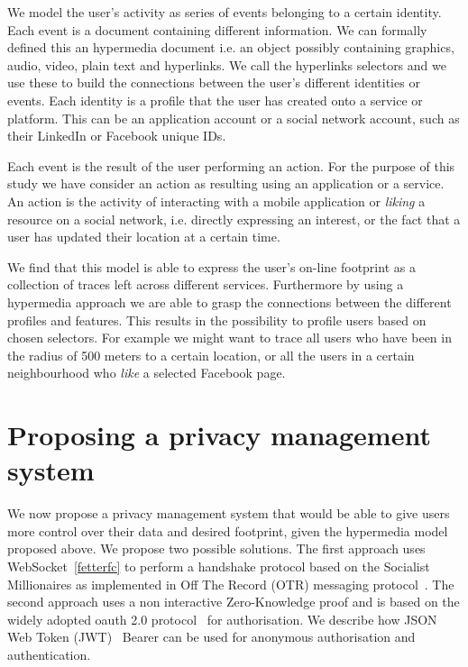 We model the user's activity as series of events belonging to a certain identity. Each event is a document containing different information. We can formally defined this an hypermedia document i.e. an object possibly containing graphics, audio, video, plain text and hyperlinks. We call the hyperlinks selectors and we use these to build the connections between the user's different identities or events. Each identity is a profile that the user has created onto a service or platform. This can be an application account or a social network account, such as their LinkedIn or Facebook unique IDs.

Each event is the result of the user performing an action. For the purpose of this study we have consider an action as resulting using an application or a service. An action is the activity of interacting with a mobile application or \emph{liking} a resource on a social network, i.e. directly expressing an interest, or the fact that a user has updated their location at a certain time.

We find that this model is able to express the user's on-line footprint as a collection of traces left across different services. Furthermore by using a hypermedia approach we are able to grasp the connections between the different profiles and features. This results in the possibility to profile users based on chosen selectors. For example we might want to trace all users who have been in the radius of 500 meters to a certain location, or all the users in a certain neighbourhood who \emph{like} a selected Facebook page.

\section{Proposing a privacy management system}

We now propose a privacy management system that would be able to give users more control over their data and desired footprint, given the hypermedia model proposed above. We propose two possible solutions. The first approach uses WebSocket~\ref{fetterfc} to perform a handshake protocol based on the Socialist Millionaires as implemented in Off The Record (OTR) messaging protocol~\cite{goldberg2012off}. The second approach uses a non interactive Zero-Knowledge proof and is based on the widely adopted oauth 2.0 protocol~\cite{hardt2012oauth} for authorisation. We describe how JSON Web Token (JWT)~\cite{jones2015json} Bearer can be used for anonymous authorisation and authentication.

